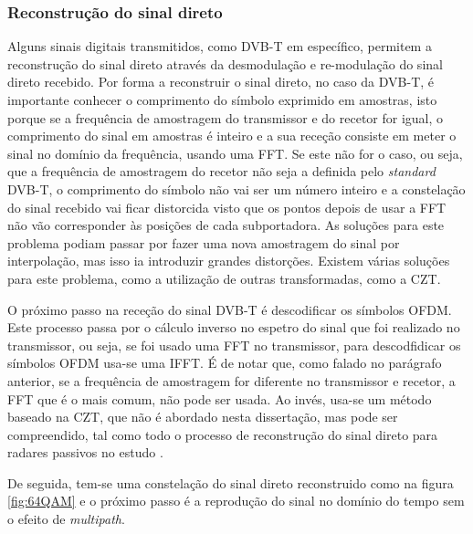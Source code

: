 \subsubsection*{Reconstrução do sinal direto} \label{Reconstrução do sinal direto}
Alguns sinais digitais transmitidos, como \gls{DVB-T} em específico, permitem a reconstrução do sinal direto através da desmodulação e re-modulação do sinal direto recebido. Por forma a reconstruir o sinal direto, no caso da \gls{DVB-T}, é importante conhecer o comprimento do símbolo exprimido em amostras, isto porque se a frequência de amostragem do transmissor e do recetor for igual, o comprimento do sinal em amostras é inteiro e a sua receção consiste em meter o sinal no domínio da frequência, usando uma \gls{FFT}. Se este não for o caso, ou seja, que a frequência de amostragem do recetor não seja a definida pelo \textit{standard} \gls{DVB-T}, o comprimento do símbolo não vai ser um número inteiro e a constelação do sinal recebido vai ficar distorcida visto que os pontos depois de usar a \gls{FFT} não vão corresponder às posições de cada subportadora. As soluções para este problema podiam passar por fazer uma nova amostragem do sinal por interpolação, mas isso ia introduzir grandes distorções. Existem várias soluções para este problema, como a utilização de outras transformadas, como a \gls{CZT}.\par 
O próximo passo na receção do sinal \gls{DVB-T} é descodificar os símbolos \gls{OFDM}. Este processo passa por o cálculo inverso no espetro do sinal que foi realizado no transmissor, ou seja, se foi usado uma \gls{FFT} no transmissor, para descodfidicar os símbolos \gls{OFDM} usa-se uma \gls{IFFT}. É de notar que, como falado no parágrafo anterior, se a frequência de amostragem for diferente no transmissor e recetor, a \gls{FFT} que é o mais comum, não pode ser usada. Ao invés, usa-se um método baseado na \gls{CZT}, que não é abordado nesta dissertação, mas pode ser compreendido, tal como todo o processo de reconstrução do sinal direto para radares passivos no estudo \cite{Baczyk2011}.\par 
De seguida, tem-se uma constelação do sinal direto reconstruido como na figura \ref{fig:64QAM} e o próximo passo é a reprodução do sinal no domínio do tempo sem o efeito de \textit{multipath}.

